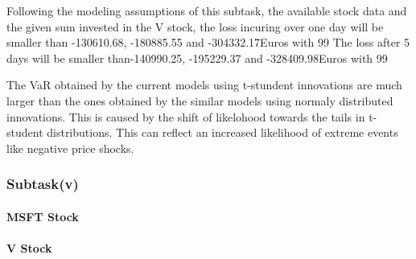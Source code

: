 Following the modeling assumptions of this subtask, the available stock data and the given sum invested in the V stock, the loss incuring over one day will be smaller than -130610.68, -180885.55 and -304332.17Euros with 99%
The loss after 5 days will be smaller than-140990.25, -195229.37 and -328409.98Euros with 99%

The VaR obtained by the current models using t-stundent innovations are much larger than the ones obtained by the similar models using normaly distributed innovations. This is caused by the shift of likelohood towards the tails in t-student distributions. This can reflect an increased likelihood of extreme events like negative price shocks.

\subsubsection{Subtask(v)}
\paragraph{MSFT Stock}

\paragraph{V Stock}
